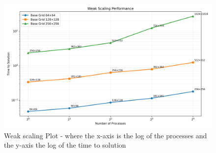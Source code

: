 \documentclass[unicode,11pt,a4paper,oneside,numbers=endperiod,openany]{scrartcl}
\begin{document}
\begin{figure}[H]
  \centering
  \includegraphics[width=\textwidth]{../code/mini_app/weakscaling/weak_scaling.png}
  \caption{Weak scaling Plot - where the x-axis is the log of the processes and the y-axis the log of the time to solution}
\end{figure}
\end{document}
